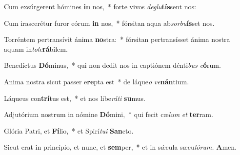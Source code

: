 \item Cum exsúrgerent hómines \textbf{in} nos,~* forte vivos \textit{deglu}\textbf{tís}sent nos:
\item Cum irascerétur furor eórum \textbf{in} nos,~* fórsitan aqua ab\textit{sorbu}\textbf{ís}set nos.
\item Torréntem pertransívit ánima \textbf{no}stra:~* fórsitan pertransísset ánima nostra aquam in\hspace{0.03em}\textit{tole}\textbf{rá}bilem.
\item Benedíctus \textbf{Dó}minus,~* qui non dedit nos in captiónem dénti\textit{bus} \textit{e}\textbf{ó}rum.
\item Anima nostra sicut passer e\textbf{re}pta est~* de láque\hspace{0.03em}\textit{o} \textit{ve}\textbf{nán}tium.
\item Láqueus con\textbf{trí}tus est,~* et nos libe\textit{ráti} \textbf{su}mus.
\item Adjutórium nostrum in nómine \textbf{Dó}mini,~* qui fecit cæ\hspace{0.03em}\textit{lum} \textit{et} \textbf{ter}ram.
\item Glória Patri, et \textbf{Fí}lio,~* et Spirí\hspace{0.03em}\textit{tui} \textbf{San}cto.
\item Sicut erat in princípio, et nunc, et \textbf{sem}per,~* et in sǽcula sæcu\hspace{0.03em}\textit{lórum.} \textbf{A}men.